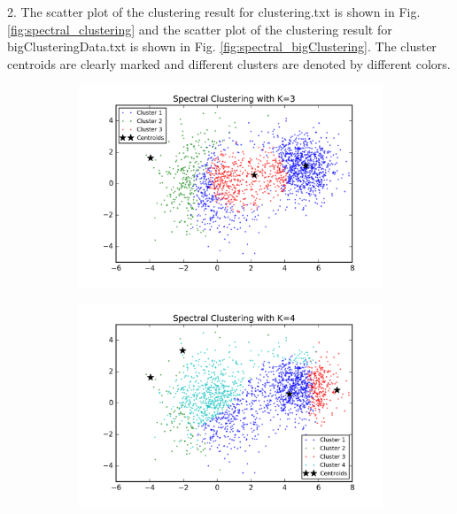 \begin{description}
\begin{description}
\item{2.} The scatter plot of the clustering result for clustering.txt is shown in Fig. \ref{fig:spectral_clustering} and the scatter plot of the clustering result for bigClusteringData.txt is shown in Fig. \ref{fig:spectral_bigClustering}. The cluster centroids are clearly marked and different clusters are denoted by different colors. 

\begin{figure}[!h]
        \centering
        \begin{subfigure}[b]{0.475\textwidth}
            \centering
            \includegraphics[width=\textwidth]{./figures/clustering_spectral_3.png}
        \end{subfigure}
        \hfill
        \begin{subfigure}[b]{0.475\textwidth}  
            \centering 
            \includegraphics[width=\textwidth]{./figures/clustering_spectral_4.png}

\end{subfigure}
\end{figure}
\end{description}
\end{description}
